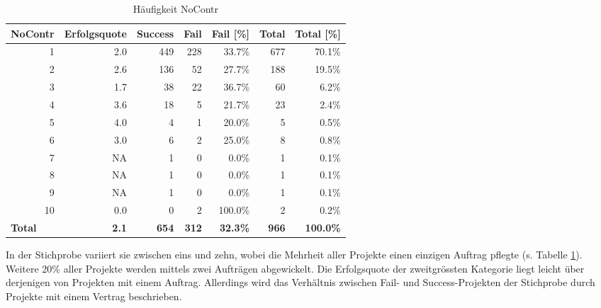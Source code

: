 \begin{table}[H]
	\centering
	\caption{Häufigkeit NoContr}
	\begin{tabular}{lrrrrrr}
		\textbf{NoContr} & \multicolumn{1}{l}{\textbf{Erfolgsquote}} & \multicolumn{1}{l}{\textbf{Success}} & \multicolumn{1}{l}{\textbf{Fail}} & \multicolumn{1}{l}{\textbf{Fail [\%]}} & \multicolumn{1}{l}{\textbf{Total}} & \multicolumn{1}{l}{\textbf{Total [\%]}} \\\hline
		\multicolumn{1}{r}{1} & 2.0   & 449   & 228   & 33.7\% & 677   & 70.1\% \\
		\multicolumn{1}{r}{2} & 2.6   & 136   & 52    & 27.7\% & 188   & 19.5\% \\
		\multicolumn{1}{r}{3} & 1.7   & 38    & 22    & 36.7\% & 60    & 6.2\% \\
		\multicolumn{1}{r}{4} & 3.6   & 18    & 5     & 21.7\% & 23    & 2.4\% \\
		\multicolumn{1}{r}{5} & 4.0   & 4     & 1     & 20.0\% & 5     & 0.5\% \\
		\multicolumn{1}{r}{6} & 3.0   & 6     & 2     & 25.0\% & 8     & 0.8\% \\
		\multicolumn{1}{r}{7} & NA    & 1     & 0     & 0.0\% & 1     & 0.1\% \\
		\multicolumn{1}{r}{8} & NA    & 1     & 0     & 0.0\% & 1     & 0.1\% \\
		\multicolumn{1}{r}{9} & NA    & 1     & 0     & 0.0\% & 1     & 0.1\% \\
		\multicolumn{1}{r}{10} & 0.0   & 0     & 2     & 100.0\% & 2     & 0.2\% \\\hline
		\textbf{Total} & \textbf{2.1} & \textbf{654} & \textbf{312} & \textbf{32.3\%} & \textbf{966} & \textbf{100.0\%} \\
	\end{tabular}%
	\label{fnocontr}%
\end{table}%
In der Stichprobe variiert sie zwischen eins und zehn, wobei die Mehrheit aller Projekte einen einzigen Auftrag pflegte (s. Tabelle \ref{fnocontr}). Weitere 20\% aller Projekte werden mittels zwei Aufträgen abgewickelt. Die Erfolgsquote der zweitgrössten Kategorie liegt leicht über derjenigen von Projekten mit einem Auftrag. Allerdings wird das Verhältnis zwischen Fail- und Success-Projekten der Stichprobe durch Projekte mit einem Vertrag beschrieben.
\newline
%
%

